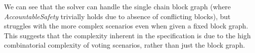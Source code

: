 We can see that the solver can handle the single chain block graph (where
\textit{AccountableSafety} trivially holds due to absence of conflicting
blocks), but struggles with the more complex scenarios even when given a fixed
block graph. This suggests that the complexity inherent in the specification is
due to the high combinatorial complexity of voting scenarios, rather than just
the block graph.

